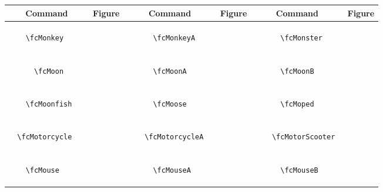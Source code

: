\documentclass[x11names]{article}
\begin{document}
\begin{table}[H]\centering\begin{tabular}{|c|c|c|c|c|c|}\hline{\bf Command} & {\bf Figure} & {\bf Command} & {\bf Figure} & {\bf Command} & {\bf Figure}\\	\hline	&\multirow{5}{*}{	\fcMonkey	[scale=0.64]} & &\multirow{5}{*}{	\fcMonkeyA	[scale=0.16]} & &\multirow{5}{*}{	\fcMonster	[scale=0.16]}\\	& & & & & \\	& & & & & \\	\verb|	\fcMonkey	| & & \verb|	\fcMonkeyA	| & & \verb|	\fcMonster	| & \\	& & & & & \\	& & & & & \\	& & & & & \\	\hline									
		&\multirow{5}{*}{	\fcMoon	[scale=0.64]} & &\multirow{5}{*}{	\fcMoonA	[scale=0.16]} & &\multirow{5}{*}{	\fcMoonB	[scale=0.16]}\\	& & & & & \\	& & & & & \\	\verb|	\fcMoon	| & & \verb|	\fcMoonA	| & & \verb|	\fcMoonB	| & \\	& & & & & \\	& & & & & \\	& & & & & \\	\hline									
		&\multirow{5}{*}{	\fcMoonfish	[scale=0.16]} & &\multirow{5}{*}{	\fcMoose	[scale=0.16]} & &\multirow{5}{*}{	\fcMoped	[scale=0.16]}\\	& & & & & \\	& & & & & \\	\verb|	\fcMoonfish	| & & \verb|	\fcMoose	| & & \verb|	\fcMoped	| & \\	& & & & & \\	& & & & & \\	& & & & & \\	\hline									
		&\multirow{5}{*}{	\fcMotorcycle	[scale=0.16]} & &\multirow{5}{*}{	\fcMotorcycleA	[scale=0.16]} & &\multirow{5}{*}{	\fcMotorScooter	[scale=0.16]}\\	& & & & & \\	& & & & & \\	\verb|	\fcMotorcycle	| & & \verb|	\fcMotorcycleA	| & & \verb|	\fcMotorScooter	| & \\	& & & & & \\	& & & & & \\	& & & & & \\	\hline									
		&\multirow{5}{*}{	\fcMouse	[scale=0.0064]} & &\multirow{5}{*}{	\fcMouseA	[scale=0.64]} & &\multirow{5}{*}{	\fcMouseB	[scale=0.16]}\\	& & & & & \\	& & & & & \\	\verb|	\fcMouse	| & & \verb|	\fcMouseA	| & & \verb|	\fcMouseB	| & \\	& & & & & \\	& & & & & \\	& & & & & \\	\hline									

\end{tabular}
\end{table}
\end{document}
